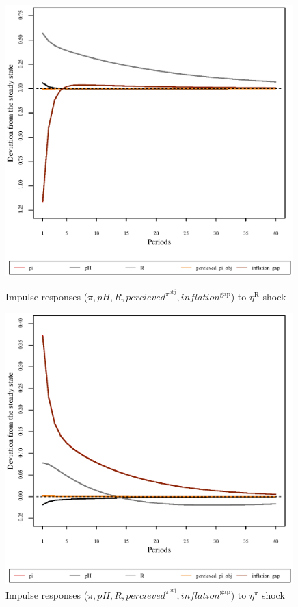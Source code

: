 \begin{figure}[h]
\begin{minipage}{0.5\textwidth}
\vspace*{-3em}
\centering
\includegraphics[width=0.99\textwidth, scale=0.55]{plots/plot_73.eps}
\caption{Impulse responses ($\pi, {p\!H}, R, {p\!e\!r\!c\!i\!e\!v\!e\!d}^{\pi^{\mathrm{obj}}}, {i\!n\!f\!l\!a\!t\!i\!o\!n}^{\mathrm{gap}}$) to $\eta^{\mathrm{R}}$ shock}
\end{minipage}
\begin{minipage}{0.5\textwidth}
\vspace*{-3em}
\centering
\includegraphics[width=0.99\textwidth, scale=0.55]{plots/plot_74.eps}
\caption{Impulse responses ($\pi, {p\!H}, R, {p\!e\!r\!c\!i\!e\!v\!e\!d}^{\pi^{\mathrm{obj}}}, {i\!n\!f\!l\!a\!t\!i\!o\!n}^{\mathrm{gap}}$) to $\eta^{\pi}$ shock}
\end{minipage}
\end{figure}

